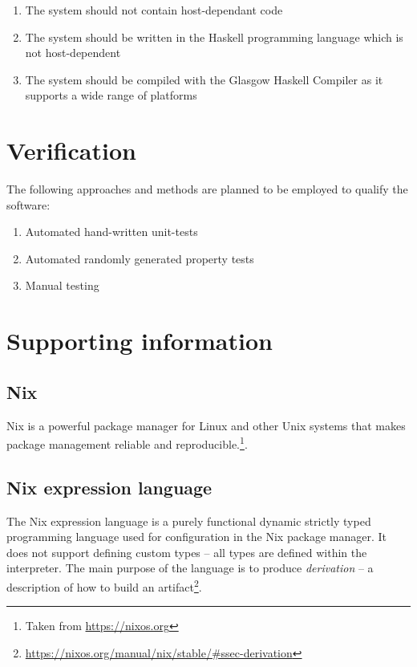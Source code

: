 \documentclass[12pt]{article}
\begin{document}
\begin{enumerate}
  \item The system should not contain host-dependant code
  \item The system should be written in the Haskell programming language which is not host-dependent
  \item The system should be compiled with the Glasgow Haskell Compiler as it supports a wide range of platforms
\end{enumerate}

\section{Verification}

The following approaches and methods are planned to be employed to qualify the software:

\begin{enumerate}
  \item Automated hand-written unit-tests
  \item Automated randomly generated property tests
  \item Manual testing
\end{enumerate}

\section{Supporting information}

\subsection{Nix}

Nix is a powerful package manager for Linux and other Unix systems that makes package management reliable and reproducible.\footnote{Taken from \url{https://nixos.org}}.

\subsection{Nix expression language}

The Nix expression language is a purely functional dynamic strictly typed programming language used for configuration in the Nix package manager. It does not support defining custom types – all types are defined within the interpreter. The main purpose of the language is to produce \emph{derivation} – a description of how to build an artifact\footnote{\url{https://nixos.org/manual/nix/stable/\#ssec-derivation}}.
\end{document}
